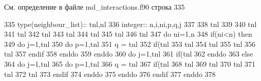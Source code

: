 См. определение в файле md\+\_\+interactions.\+f90 строка 335


\begin{DoxyCode}
335     \textcolor{keywordtype}{type}(neighbour\_list):: tnl,nl
336     \textcolor{keywordtype}{integer}:: n,i,ni,p,q,j
337     
338     tnl%
339     
340     tnl%
341     tnl%
342     tnl%
343     tnl%
344     tnl%
345     tnl%
346     tnl%
347     \textcolor{keywordflow}{do} ni=1,n
348         \textcolor{keywordflow}{if}(ni<n) \textcolor{keywordflow}{then}
349             \textcolor{keywordflow}{do} j=1,tnl%
350                 \textcolor{keywordflow}{do} p=1,tnl%
351                     q = tnl%
352                     \textcolor{keywordflow}{if}(tnl%
353                         tnl%
354                         tnl%
355                         tnl%
356                         tnl%
357 \textcolor{keywordflow}{                    endif}
358 \textcolor{keywordflow}{                enddo}
359 \textcolor{keywordflow}{            enddo}
360             \textcolor{keywordflow}{do} j=1,tnl%
361                 \textcolor{keywordflow}{if}(tnl%
362 \textcolor{keywordflow}{            enddo}
363         \textcolor{keywordflow}{else}
364             \textcolor{keywordflow}{do} j=1,tnl%
365                 \textcolor{keywordflow}{do} p=1,tnl%
366                     q = tnl%
367                     \textcolor{keywordflow}{if}(tnl%
368                         tnl%
369                         tnl%
370                         tnl%
371                         tnl%
372                         tnl%
373 \textcolor{keywordflow}{                    endif}
374 \textcolor{keywordflow}{                enddo}
375 \textcolor{keywordflow}{            enddo}
376 \textcolor{keywordflow}{        endif}
377 \textcolor{keywordflow}{    enddo}
378     
\end{DoxyCode}
\mbox{\label{namespacemd__interactions_a52c7d3a0c8df2f15b75c8fef73ee795d}} 
